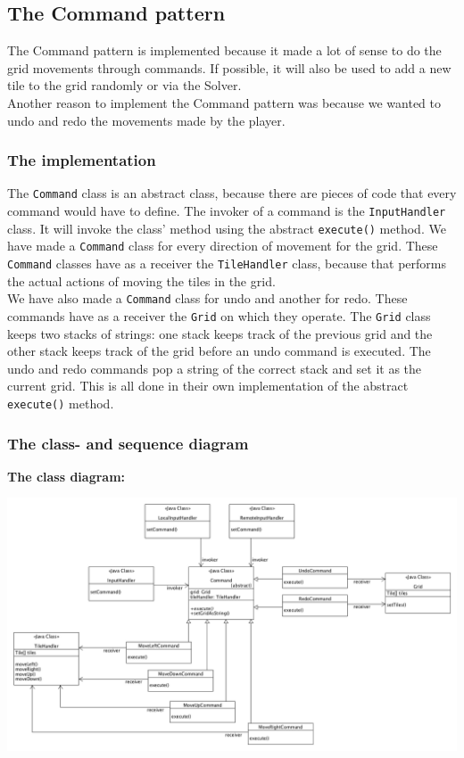 \documentclass[a4paper,11pt,report]{scrartcl}
\begin{document}
\subsection{The Command pattern}
The Command pattern is implemented because it made a lot of sense to do the grid 
movements through commands. If possible, it will also be used to add a
new tile to the grid randomly or via the Solver.\\

Another reason to implement the Command pattern was because we wanted to undo and redo the
movements made by the player.

\subsubsection{The implementation}
The \texttt{Command} class is an abstract class, because there are pieces of
code that every command would have to define. The invoker of a command is the
\texttt{InputHandler} class. It will invoke the class' method using the abstract
\texttt{execute()} method. We have made a \texttt{Command} class for every direction of
movement for the grid. These \texttt{Command} classes have as a receiver the
\texttt{TileHandler} class, because that performs the actual actions
of moving the tiles in the grid.\\

We have also made a \texttt{Command} class for undo and another for redo. These
commands have as a receiver the \texttt{Grid} on which they operate. The \texttt{Grid} class
keeps two stacks of strings: one stack keeps track of the previous grid and the other stack 
keeps track of the grid before an undo command is executed. 
The undo and redo commands pop a string of the correct stack and set it as the current grid. This is all done in their own implementation of the abstract \texttt{execute()} method.

\newpage
\subsubsection{The class- and sequence diagram}
\textbf{The class diagram:}\\
\centerline{\includegraphics[scale=0.4]{sources/commandPatternUML}}
\end{document}
